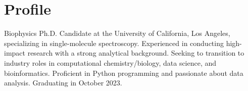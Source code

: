 \section{Profile}

Biophysics Ph.D. Candidate at the University of California, Los Angeles, specializing in single-molecule spectroscopy. 
Experienced in conducting high-impact research with a strong analytical background. 
Seeking to transition to industry roles in computational chemistry/biology, data science, and bioinformatics. 
Proficient in Python programming and passionate about data analysis.
Graduating in October 2023.